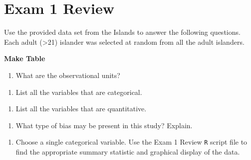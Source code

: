 \documentclass[
]{report}
\providecommand{\tightlist}{%
  \setlength{\itemsep}{0pt}\setlength{\parskip}{0pt}}
\begin{document}
\vspace{1in}

\hypertarget{exam-1-review}{%
\chapter{Exam 1 Review}\label{exam-1-review}}

Use the provided data set from the Islands to answer the following questions. Each adult (\textgreater21) islander was selected at random from all the adult islanders.

\textbf{Make Table}

\begin{enumerate}
\def\labelenumi{\arabic{enumi}.}
\tightlist
\item
  What are the observational units?
\end{enumerate}

\vspace{0.3in}

\begin{enumerate}
\def\labelenumi{\arabic{enumi}.}
\setcounter{enumi}{1}
\tightlist
\item
  List all the variables that are categorical.
\end{enumerate}

\vspace{0.8in}

\begin{enumerate}
\def\labelenumi{\arabic{enumi}.}
\setcounter{enumi}{2}
\tightlist
\item
  List all the variables that are quantitative.
\end{enumerate}

\vspace{0.8in}

\begin{enumerate}
\def\labelenumi{\arabic{enumi}.}
\setcounter{enumi}{3}
\tightlist
\item
  What type of bias may be present in this study? Explain.
\end{enumerate}

\vspace{0.5in}

\begin{enumerate}
\def\labelenumi{\arabic{enumi}.}
\setcounter{enumi}{4}
\tightlist
\item
  Choose a single categorical variable. Use the Exam 1 Review \texttt{R} script file to find the appropriate summary statistic and graphical display of the data.
\end{enumerate}
\end{document}
